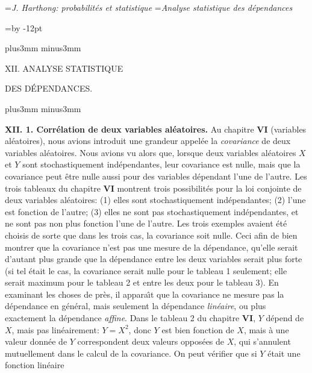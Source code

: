 


\auteurcourant={\sl J. Harthong: probabilit\'es et statistique}
\titrecourant={\sl Analyse statistique des d\'ependances}


\def\xx{\hskip-5pt + \hskip-5pt} 
\def\tv{\vrule height 30pt depth 6pt width0.4pt} 
\def\punkt{\vrule height0.4pt depth0pt width0.4pt} 
 
\newdimen\blocksize  \blocksize=\vsize  \advance\blocksize by -12pt 

\null\vskip11mm plus3mm minus3mm
 
\centerline{\tit XII. ANALYSE STATISTIQUE} 
\vskip7pt
\centerline{\tit DES D\'EPENDANCES.} 

\vskip11mm plus3mm minus3mm
 
{\bf XII. 1. Corr\'elation de deux variables al\'eatoires.}
\medskip 
Au chapitre {\bf VI} (variables al\'eatoires), nous avions introduit une 
grandeur appel\'ee la {\it covariance} de deux variables al\'eatoires. 
Nous avions vu alors que, lorsque deux variables al\'eatoires $X$ et $Y$ 
sont stochastiquement ind\'ependantes, leur covariance est nulle, mais 
que la covariance peut \^etre nulle aussi pour des variables d\'ependant 
l'une de l'autre. Les trois tableaux du chapitre {\bf VI} montrent trois 
possibilit\'es pour la loi conjointe de deux va\-ria\-bles al\'eatoires: 
(1) elles sont stochastiquement ind\'ependantes; (2) l'une est fonction de 
l'autre; (3) elles ne sont pas stochastiquement ind\'ependantes, et ne 
sont pas non plus fonction l'une de l'autre. Les trois exemples avaient
\'et\'e choisis de sorte que dans les trois cas, la covariance soit nulle. 
Ceci afin de bien montrer que la covariance n'est pas une mesure de la 
d\'ependance, qu'elle serait d'autant plus grande que la d\'ependance entre 
les deux varia\-bles serait plus forte (si tel \'etait le cas, la covariance 
serait nulle pour le tableau 1 seulement; elle serait maximum pour le 
tableau 2 et entre les deux pour le tableau 3). En examinant les
choses de pr\`es, il appara{\^\i}t que la covariance ne mesure pas
la d\'ependance en g\'en\'eral, mais seulement la d\'ependance
{\it lin\'eaire},  ou plus exactement la d\'ependance {\it affine}. 
Dans le tableau 2 du chapitre {\bf VI}, $Y$ d\'epend de $X$, 
mais pas lin\'eairement: $Y = X^2$, donc $Y$ est bien fonction de $X$, 
mais \`a une valeur donn\'ee de $Y$ correspondent deux valeurs 
oppos\'ees de $X$, qui s'annulent mutuellement dans le calcul de la 
covariance. On peut v\'erifier que si $Y$ \'etait une fonction lin\'eaire 

